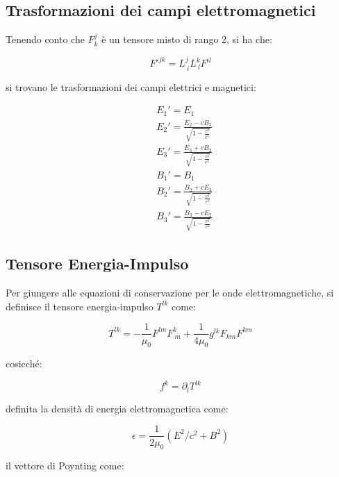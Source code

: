 \documentclass{article}
\begin{document}
\subsection{Trasformazioni dei campi elettromagnetici}

Tenendo conto che $F^j_k$ è un tensore misto di rango 2, si ha che:

\begin{equation}
    F'^{jk}=L^j_{\ i}L^k_{\ l}F^{il}
\end{equation}

si trovano le trasformazioni dei campi elettrici e magnetici:

\begin{equation}
    \begin{aligned}
        & E_1'=E_1 \\
        & E_2'=\frac{E_2-vB_3}{\sqrt{1-\frac{v^2}{c^2}}} \\
        & E_3'=\frac{E_3+vB_2}{\sqrt{1-\frac{v^2}{c^2}}} \\
        & B_1'=B_1 \\
        & B_2'=\frac{B_2+vE_3}{\sqrt{1-\frac{v^2}{c^2}}} \\
        & B_3'=\frac{B_3-vE_2}{\sqrt{1-\frac{v^2}{c^2}}}
    \end{aligned}
\end{equation}

\subsection{Tensore Energia-Impulso}
Per giungere alle equazioni di conservazione per le onde elettromagnetiche, si definisce il tensore
energia-impulso $T^{lk}$ come:

\begin{equation}
    T^{lk}=-\frac{1}{\mu_0}F^{lm}F^k_{\ m}+\frac{1}{4\mu_0}g^{lk}F_{km}F^{km}
\end{equation}

cosicché:

\begin{equation}
   f^k=\partial_l T^{lk}
\end{equation}

definita la densità di energia elettromagnetica come:

\begin{equation}
    \epsilon=\frac{1}{2\mu_0}(E^2/c^2+B^2)
\end{equation}

il vettore di Poynting come:
\end{document}
